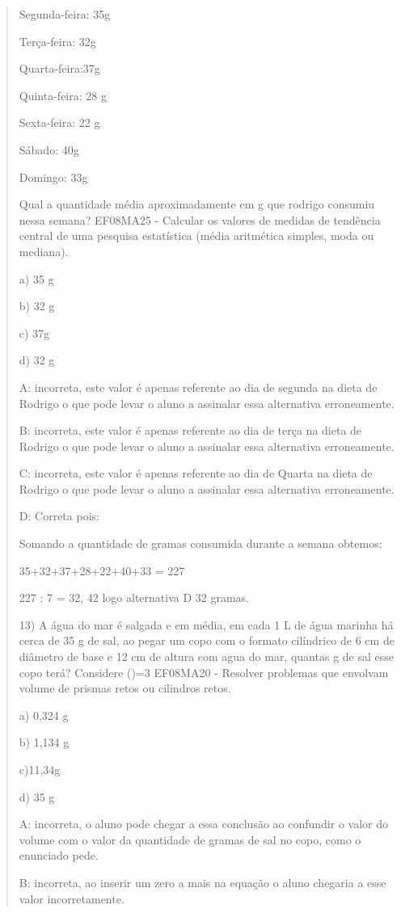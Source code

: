 \begin{quote}
\begin{escolha}
Segunda-feira: 35g

Terça-feira: 32g

Quarta-feira:37g

Quinta-feira: 28 g

Sexta-feira: 22 g

Sábado: 40g

Domingo: 33g

Qual a quantidade média aproximadamente em g que rodrigo consumiu nessa
semana? EF08MA25 - Calcular os valores de medidas de tendência central
de uma pesquisa estatística (média aritmética simples, moda ou mediana).

a) 35 g

b) 32 g

c) 37g

d) 32 g

A: incorreta, este valor é apenas referente ao dia de segunda na dieta
de Rodrigo o que pode levar o aluno a assinalar essa alternativa
erroneamente.

B: incorreta, este valor é apenas referente ao dia de terça na dieta de
Rodrigo o que pode levar o aluno a assinalar essa alternativa
erroneamente.

C: incorreta, este valor é apenas referente ao dia de Quarta na dieta de
Rodrigo o que pode levar o aluno a assinalar essa alternativa
erroneamente.

D: Correta pois:

Somando a quantidade de gramas consumida durante a semana obtemos:

35+32+37+28+22+40+33 = 227

227 : 7 = 32, 42 logo alternativa D 32 gramas.

13) A água do mar é salgada e em média, em cada 1 L de água marinha há
cerca de 35 g de sal, ao pegar um copo com o formato cilíndrico de 6 cm
de diâmetro de base e 12 cm de altura com agua do mar, quantas g de sal
esse copo terá? Considere (\Pi)=3 EF08MA20 - Resolver problemas que
envolvam volume de prismas retos ou cilindros retos.

a) 0,324 g

b) 1,134 g

c)11,34g

d) 35 g

A: incorreta, o aluno pode chegar a essa conclusão ao confundir o valor
do volume com o valor da quantidade de gramas de sal no copo, como o
enunciado pede.

B: incorreta, ao inserir um zero a mais na equação o aluno chegaria a
esse valor incorretamente.


\end{escolha}
\end{quote}
